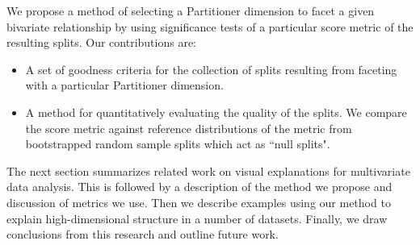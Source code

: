 We propose a method of selecting a Partitioner dimension to facet a given bivariate relationship by using significance tests of a particular score metric of the resulting splits. Our contributions are:
\begin{itemize}
    \item A set of goodness criteria for the collection of splits resulting from faceting with a particular Partitioner dimension.
    \item A method for quantitatively evaluating the quality of the splits. We compare the score metric against  reference distributions of the metric from bootstrapped random sample splits which act as ``null splits".
\end{itemize}

The next section summarizes related work on visual explanations for multivariate data analysis. This is followed by a description of the method we propose and discussion of metrics we use. Then we describe examples using our method to explain high-dimensional structure in a number of datasets. Finally, we draw conclusions from this research and outline future work.



